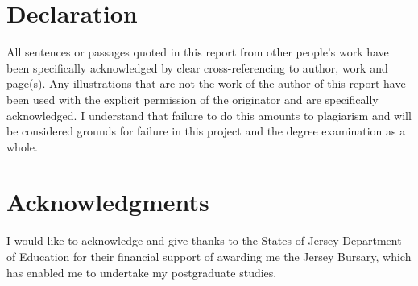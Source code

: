 \documentclass[a4paper,12pt,titlepage,openright]{report}
\begin{document}


\chapter*{Declaration}
All sentences or passages quoted in this report from other people's work have been specifically acknowledged by clear cross-referencing to author, work and page(s). Any illustrations that are not the work of the author of this report have been used with the explicit permission of the originator and are specifically acknowledged. I understand that failure to do this amounts to plagiarism and will be considered grounds for failure in this project and the degree examination as a whole.

\chapter*{Acknowledgments}
I would like to acknowledge and give thanks to the States of Jersey Department of Education for their financial support of awarding me the Jersey Bursary, which has enabled me to undertake my postgraduate studies. 
\tableofcontents
\cleardoublepage{}

 







\end{document}
